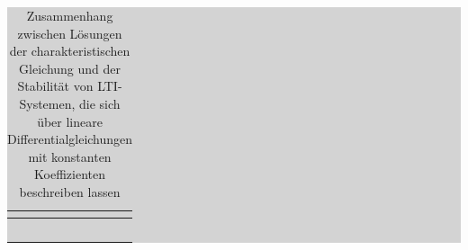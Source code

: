 \begin{table}[H]
\caption{Zusammenhang zwischen Lösungen der charakteristischen Gleichung und der Stabilität von LTI-Systemen, die sich über lineare Differentialgleichungen mit konstanten Koeffizienten beschreiben lassen }
\setlength{\fboxsep}{0pt}%
\colorbox{lightgray}{%
%
\begin{tabular}{| c | c |}
\hline
\parbox[c][0.28in][c]{3.3in}{\smallskip\centering\textbf{\selectfont{Gesetz}}} & \parbox[c][0.28in][c]{3.3in}{\smallskip\centering\textbf{\selectfont{Mathematische Beschreibung}}}\\ \hline

\parbox[c][0.7in][c]{3.3in}{} &
\parbox[c][0.7in][c]{3.3in}{}\\ \hline

\parbox[c][0.8in][c]{3.3in}{} & 
\parbox[c][0.8in][c]{3.3in}{}\\ \hline

\parbox[c][0.8in][c]{3.3in}{} &
\parbox[c][0.8in][c]{3.3in}{}\\ \hline

\parbox[c][0.8in][c]{3.3in}{} &
\parbox[c][0.8in][c]{3.3in}{}\\ \hline

\parbox[c][0.8in][c]{3.3in}{} &
\parbox[c][0.8in][c]{3.3in}{}\\ \hline

\end{tabular}%
}\bigskip
\label{tab:threeeight}
\end{table}

